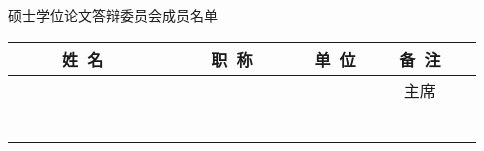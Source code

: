 \newpage
\thispagestyle{empty}
\vspace*{2em}

\begin{center}\STSong{}
 \underline{\makebox[4em][c]{\ccauthor}} 硕士学位论文答辩委员会成员名单
\end{center}

\begin{center}
\renewcommand{\arraystretch}{1.4}
\begin{tabular}{|c|c|c|c|} \hline
~~~~~姓~名~~~~~ & ~~~~~职~称~~~~~ & \hspace{6em}单~位\hspace{6em} & ~~~备~注~~~\\
\hline
  &       &     & 主席  \\ \hline
  &       &     &       \\ \hline
  &       &     &       \\ \hline
  &       &     &       \\ \hline
  &       &     &       \\ \hline
  &       &     &       \\ \hline
  &       &     &       \\ \hline
\end{tabular}
\end{center}
